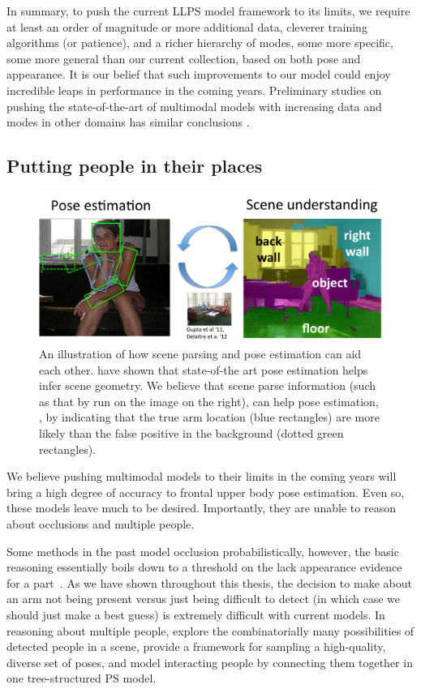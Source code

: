 In summary, to push the current LLPS model framework to its limits, we require 
at least an order of magnitude or more additional data, cleverer training 
algorithms (or patience), and a richer hierarchy of modes, some more specific, 
some more general than our current collection, based on both pose and 
appearance.  It is our belief that such improvements to our model could enjoy 
incredible leaps in performance in the coming years.  Preliminary studies on 
pushing the state-of-the-art of multimodal models with increasing data and 
modes in other domains has similar conclusions \citep{zhuwe}.

\subsection{Putting people in their places}

\begin{figure}[tb!]
\centering
\includegraphics[width=0.80\linewidth]{figs/pose+scene.pdf}
\caption[Joint pose and scene reasoning.]{
\label{fig:pose-scene} {An illustration of how scene parsing and pose 
estimation can aid each other. \citet{gupta11,delaitre12} have shown that 
state-of-the art pose estimation helps infer scene geometry.  We believe that 
scene parse information (such as that by \citet{lee09} run on the image on the 
right), can help pose estimation, \eg, by indicating that the true arm location 
(blue rectangles) are more likely than the false positive in the background 
(dotted green rectangles). }}
\end{figure}


We believe pushing multimodal models to their limits in the coming years will 
bring a high degree of accuracy to frontal upper body pose estimation.  Even 
so, these models leave much to be desired.  Importantly, they are unable to 
reason about occlusions and multiple people. 

Some methods in the past model occlusion probabilistically, however, the basic 
reasoning essentially boils down to a threshold on the lack appearance evidence 
for a part~\citep{wang2008multiple}.  As we have shown throughout this thesis, 
the decision to make about an arm not being present versus just being difficult 
to detect (in which case we should just make a best guess) is extremely 
difficult with current models.  In reasoning about multiple people, 
\citet{eichner2010we} explore the combinatorially many possibilities of 
detected people in a scene, \citet{kulesza11} provide a framework for sampling 
a high-quality, diverse set of poses, and \citet{andriluka-multiple} model 
interacting people by connecting them together in one tree-structured PS model.

